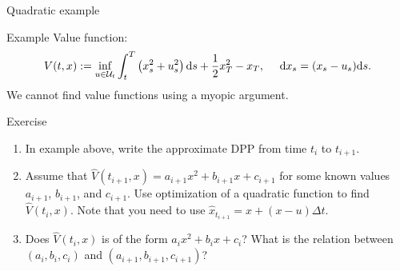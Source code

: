\documentclass[color=usenames,dvipsnames]{beamer}
\newcommand{\ds}{\text{\normalfont d}s}
\newcommand{\dx}{\text{\normalfont d}x}
\begin{document}
\begin{frame}{Quadratic example}
    \begin{block}{Example} 
Value function:
\begin{equation}
    V(t,x):= \inf_{u\in\mathcal{U}_{t}}\int_t^T\left(x_s^2+u_s^2\right){{\ds}}+\frac12x_T^2-x_T,~~~~{\dx}_s=(x_s-u_s){{\ds}}.
\end{equation}
We cannot find value functions using a myopic argument.
\end{block}
\begin{block}{Exercise}
\begin{enumerate}[label=\arabic*)]
    \item In example above, write the approximate DPP from time $t_{i}$ to $t_{i+1}$.
    \item Assume that $\hat{V}(t_{i+1},x)=a_{i+1}x^2+b_{i+1}x+c_{i+1}$ for some known values $a_{i+1}$, $b_{i+1}$, and $c_{i+1}$.
     Use  optimization of a quadratic function to find $\hat{V}(t_{i},x)$. Note that you need to use $\hat{x}_{t_{i+1}}=x+(x-u)\Delta t$.
    \item  Does $\hat{V}(t_{i},x)$ is of the form $a_{i}x^2+b_{i}x+c_{i}$? What is the relation between $(a_{i},b_{i},c_{i})$ and $(a_{i+1},b_{i+1},c_{i+1})$?
\end{enumerate}
\end{block}
\end{frame}
\end{document}

